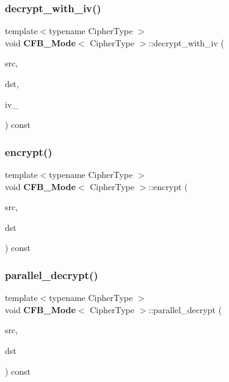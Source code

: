 \mbox{\label{class_c_f_b___mode_a8dca3882db394b8b87947337bdb3c9c1}} 
\subsubsection{decrypt\+\_\+with\+\_\+iv()}
{\footnotesize\ttfamily template$<$typename Cipher\+Type $>$ \\
void \textbf{ C\+F\+B\+\_\+\+Mode}$<$ Cipher\+Type $>$\+::decrypt\+\_\+with\+\_\+iv (\begin{DoxyParamCaption}\item[{const \textbf{ Byte\+Block} \&}]{src,  }\item[{\textbf{ Byte\+Block} \&}]{dst,  }\item[{const \textbf{ Byte\+Block} \&}]{iv\+\_\+ }\end{DoxyParamCaption}) const\hspace{0.3cm}{\ttfamily [private]}}

\mbox{\label{class_c_f_b___mode_a8090129450a70b0d7bddb34b063574bd}} 
\subsubsection{encrypt()}
{\footnotesize\ttfamily template$<$typename Cipher\+Type $>$ \\
void \textbf{ C\+F\+B\+\_\+\+Mode}$<$ Cipher\+Type $>$\+::encrypt (\begin{DoxyParamCaption}\item[{const \textbf{ Byte\+Block} \&}]{src,  }\item[{\textbf{ Byte\+Block} \&}]{dst }\end{DoxyParamCaption}) const}

\mbox{\label{class_c_f_b___mode_af15d9bf13d661e6c3a3d99c136a41150}} 
\subsubsection{parallel\+\_\+decrypt()}
{\footnotesize\ttfamily template$<$typename Cipher\+Type $>$ \\
void \textbf{ C\+F\+B\+\_\+\+Mode}$<$ Cipher\+Type $>$\+::parallel\+\_\+decrypt (\begin{DoxyParamCaption}\item[{const \textbf{ Byte\+Block} \&}]{src,  }\item[{\textbf{ Byte\+Block} \&}]{dst }\end{DoxyParamCaption}) const}



